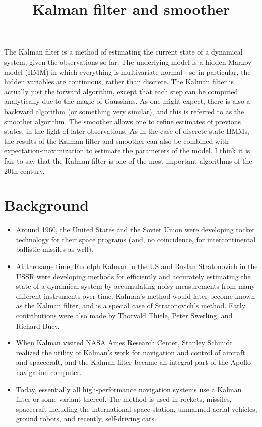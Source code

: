 \documentclass[12pt]{article}
\title{Kalman filter and smoother}
\author{}
\date{}
\begin{document}
\maketitle
\tableofcontents
\thispagestyle{firststyle}


\vspace{2em}


The Kalman filter is a method of estimating the current state of a dynamical system, given the observations so far. The underlying model is a hidden Markov model (HMM) in which everything is multivariate normal---so in particular, the hidden variables are continuous, rather than discrete. The Kalman filter is actually just the forward algorithm, except that each step can be computed analytically due to the magic of Gaussians. As one might expect, there is also a backward algorithm (or something very similar), and this is referred to as the smoother algorithm.  The smoother allows one to refine estimates of previous states, in the light of later observations. As in the case of discrete-state HMMs, the results of the Kalman filter and smoother can also be combined with expectation-maximization to estimate the parameters of the model. I think it is fair to say that the Kalman filter is one of the most important algorithms of the 20th century.

\newpage

\section{Background}

\begin{itemize}
\item Around 1960, the United States and the Soviet Union were developing rocket technology for their space programs (and, no coincidence, for intercontinental ballistic missiles as well).
\item At the same time, Rudolph Kalman in the US and Ruslan Stratonovich in the USSR were developing methods for efficiently and accurately estimating the state of a dynamical system by accumulating noisy measurements from many different instruments over time. Kalman's method would later become known as the Kalman filter, and is a special case of Stratonovich's method.  Early contributions were also made by Thorvald Thiele, Peter Swerling, and Richard Bucy.
\item When Kalman visited NASA Ames Research Center, Stanley Schmidt realized the utility of Kalman's work for navigation and control of aircraft and spacecraft, and the Kalman filter became an integral part of the Apollo navigation computer.
\item Today, essentially all high-performance navigation systems use a Kalman filter or some variant thereof.  The method is used in rockets, missiles, spacecraft including the international space station, unmanned aerial vehicles, ground robots, and recently, self-driving cars.
\end{itemize}
\end{document}
